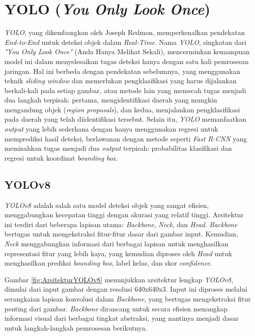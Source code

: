 \section{YOLO (\emph{You Only Look Once})}
\label{sec:YOLO}

\emph{YOLO}, yang dikembangkan oleh Joseph Redmon, memperkenalkan pendekatan \emph{End-to-End} untuk deteksi objek dalam \emph{Real-Time}. Nama \emph{YOLO}, singkatan dari \emph{"You Only Look Once"} (Anda Hanya Melihat Sekali), mencerminkan kemampuan model ini dalam menyelesaikan tugas deteksi hanya dengan satu kali pemrosesan jaringan. Hal ini berbeda dengan pendekatan sebelumnya, yang menggunakan teknik \emph{sliding window} dan memerlukan pengklasifikasi yang harus dijalankan berkali-kali pada setiap gambar, atau metode lain yang memecah tugas menjadi dua langkah terpisah: pertama, mengidentifikasi daerah yang mungkin mengandung objek (\emph{region proposals}), dan kedua, menjalankan pengklasifikasi pada daerah yang telah diidentifikasi tersebut. Selain itu, \emph{YOLO} memanfaatkan \emph{output} yang lebih sederhana dengan hanya menggunakan regresi untuk memprediksi hasil deteksi, berlawanan dengan metode seperti \emph{Fast R-CNN} yang memisahkan tugas menjadi dua \emph{output} terpisah: probabilitas klasifikasi dan regresi untuk koordinat \emph{bounding box}.

\subsection{YOLOv8}
\label{subsec:YOLOv8}

\emph{YOLOv8} adalah salah satu model deteksi objek yang sangat efisien, menggabungkan kecepatan tinggi dengan akurasi yang relatif tinggi. Arsitektur ini terdiri dari beberapa lapisan utama: \emph{Backbone}, \emph{Neck}, dan \emph{Head}. \emph{Backbone} bertugas untuk mengekstraksi fitur-fitur dasar dari gambar input. Kemudian, \emph{Neck} menggabungkan informasi dari berbagai lapisan untuk menghasilkan representasi fitur yang lebih kaya, yang kemudian diproses oleh \emph{Head} untuk menghasilkan prediksi \emph{bounding box}, label kelas, dan skor \emph{confidence}.

Gambar \ref{fig:ArsitekturYOLOv8} menunjukkan arsitektur lengkap \emph{YOLOv8}, dimulai dari input gambar dengan resolusi 640x640x3. Input ini diproses melalui serangkaian lapisan konvolusi dalam \emph{Backbone}, yang bertugas mengekstraksi fitur penting dari gambar. \emph{Backbone} dirancang untuk secara efisien menangkap informasi visual dari berbagai tingkat abstraksi, yang nantinya menjadi dasar untuk langkah-langkah pemrosesan berikutnya.


